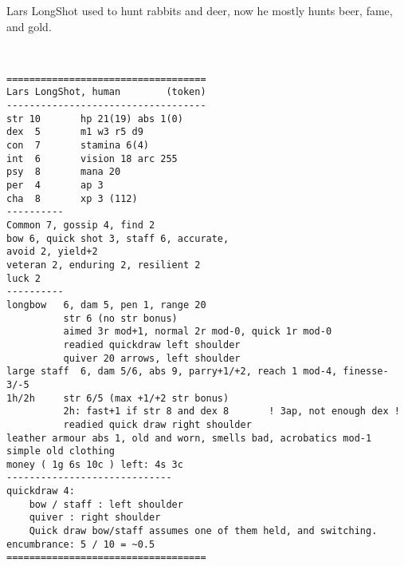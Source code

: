 \clearpage
\begin{samepage}

\noindent Lars LongShot used to hunt rabbits and deer, now he mostly hunts beer, fame, and gold.

\

\small \begin{verbatim}
===================================
Lars LongShot, human        (token)
-----------------------------------
str 10       hp 21(19) abs 1(0)
dex  5       m1 w3 r5 d9
con  7       stamina 6(4)
int  6       vision 18 arc 255
psy  8       mana 20
per  4       ap 3
cha  8       xp 3 (112)
----------
Common 7, gossip 4, find 2
bow 6, quick shot 3, staff 6, accurate, 
avoid 2, yield+2
veteran 2, enduring 2, resilient 2
luck 2
----------
longbow   6, dam 5, pen 1, range 20
          str 6 (no str bonus)
          aimed 3r mod+1, normal 2r mod-0, quick 1r mod-0 
          readied quickdraw left shoulder
          quiver 20 arrows, left shoulder
large staff  6, dam 5/6, abs 9, parry+1/+2, reach 1 mod-4, finesse-3/-5
1h/2h     str 6/5 (max +1/+2 str bonus)
          2h: fast+1 if str 8 and dex 8       ! 3ap, not enough dex !
          readied quick draw right shoulder
leather armour abs 1, old and worn, smells bad, acrobatics mod-1
simple old clothing
money ( 1g 6s 10c ) left: 4s 3c
-----------------------------
quickdraw 4:
    bow / staff : left shoulder
    quiver : right shoulder
    Quick draw bow/staff assumes one of them held, and switching.
encumbrance: 5 / 10 = ~0.5
===================================
\end{verbatim} \end{samepage} \normalsize





